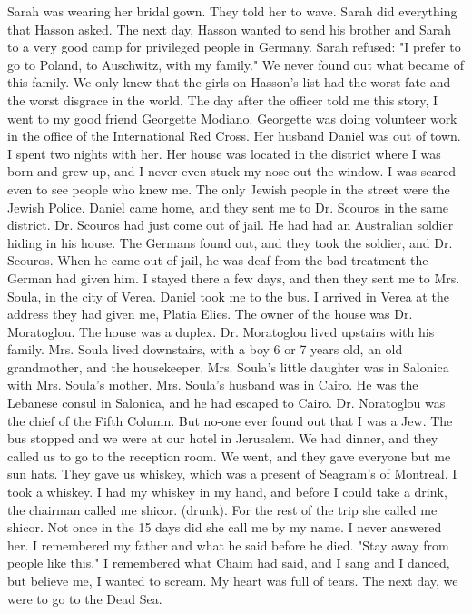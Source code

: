 Sarah 
was wearing her bridal gown.
They told her to wave.
Sarah did everything that Hasson asked.
The next day, Hasson wanted to send his brother and Sarah to a very good camp for privileged people in Germany.
Sarah refused: "I prefer to go to Poland, to Auschwitz, with my family."
We never found out what became of this family.
We only knew that the 
girls on Hasson's list had the worst fate and the worst disgrace in the 
world.
The day after the officer told me this story, I went to my good 
friend Georgette Modiano.
Georgette was doing volunteer work in the 
office of the International Red Cross.
Her husband Daniel was out of 
town.
I spent two nights with her.
Her house was located in the district 
where I was born and grew up, and I never even stuck my nose out 
the window.
I was scared even to see people who knew me.
The only 
Jewish people in the street were the Jewish Police.
Daniel came home, and they sent me to Dr.
Scouros in the same district.
Dr.
Scouros had just come out of jail.
He had had an Australian soldier hiding in his house.
The Germans found out, and they took the soldier, and Dr.
Scouros.
When he came out of jail, he was deaf from the bad treatment the German had given him.
I stayed there a few days, and then they sent me to Mrs.
Soula, in 
the city of Verea.
Daniel took me to the bus.
I arrived in Verea at 
the address they had given me, Platia Elies.
The owner of the house 
was Dr.
Moratoglou.
The house was a duplex.
Dr.
Moratoglou lived upstairs with his family.
Mrs.
Soula lived downstairs, with a boy 6 or 7 years old, an old grandmother, and the housekeeper.
Mrs.
Soula's little daughter was in Salonica with Mrs.
Soula's mother.
Mrs.
Soula's husband 
was in Cairo.
He was the Lebanese consul in Salonica, and he had escaped to Cairo.
Dr.
Noratoglou was the chief of the Fifth Column.
But no-one ever found out that I was a Jew.
The bus stopped and we were at our hotel in Jerusalem.
We had 
dinner, and they called us to go to the reception room.
We went, and 
they gave everyone but me sun hats.
They gave us whiskey, which was a 
present of Seagram's of Montreal.
I took a whiskey.
I had my whiskey in 
my hand, and before I could take a drink, the chairman called me shicor.
(drunk).
For the rest of the trip she called me shicor.
Not once in 
the 15 days did she call me by my name.
I never answered her.
I remembered my father and what he said before he died.
"Stay away from people 
like this."
I remembered what Chaim had said, and I sang and I danced, 
but believe me, I wanted to scream.
My heart was full of tears.
The next day, we were to go to the Dead Sea.
